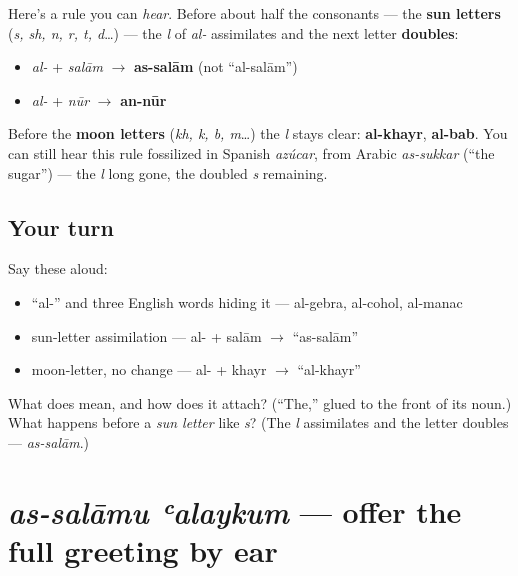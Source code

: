 \begin{grammarlens}[title={Grammar Lens: sun letters and moon letters}]
Here's a rule you can \emph{hear}. Before about half the consonants — the \textbf{sun letters} (\emph{s, sh, n, r, t, d}…) — the \emph{l} of \emph{al-} assimilates and the next letter \textbf{doubles}:

\begin{itemize}
\raggedright
  \item \emph{al-} + \emph{salām} $\to$ \textbf{as-salām} (not \textquotedblleft{}al-salām\textquotedblright{})
  \item \emph{al-} + \emph{nūr} $\to$ \textbf{an-nūr}
\end{itemize}

Before the \textbf{moon letters} (\emph{kh, k, b, m}…) the \emph{l} stays clear: \textbf{al-khayr}, \textbf{al-bab}. You can still hear this rule fossilized in Spanish \emph{azúcar}, from Arabic \emph{as-sukkar} (\textquotedblleft{}the sugar\textquotedblright{}) — the \emph{l} long gone, the doubled \emph{s} remaining.
\end{grammarlens}

\subsection*{Your turn}
Say these aloud:

\begin{itemize}
\raggedright
  \item \textquotedblleft{}al-\textquotedblright{} and three English words hiding it — al-gebra, al-cohol, al-manac
  \item sun-letter assimilation — al- + salām $\to$ \textquotedblleft{}as-salām\textquotedblright{}
  \item moon-letter, no change — al- + khayr $\to$ \textquotedblleft{}al-khayr\textquotedblright{}
\end{itemize}

\begin{tcolorbox}[breakable,colback=teal!4,colframe=teal!35!black,title={Before you move on}]
What does \textbf{} mean, and how does it attach? (\textquotedblleft{}The,\textquotedblright{} glued to the front of its noun.) What happens before a \emph{sun letter} like \emph{s}? (The \emph{l} assimilates and the letter doubles — \emph{as-salām}.)
\end{tcolorbox}
\section[as-salāmu ʿalaykum]{\emph{as-salāmu ʿalaykum} — offer the full greeting by ear}

